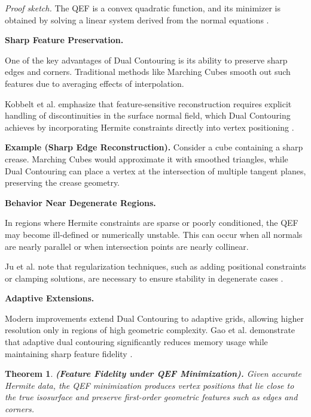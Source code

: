 \documentclass[12pt, a4paper, oneside]{book}
\theoremstyle{plain}
\newtheorem{theorem}{Theorem}[chapter]
\theoremstyle{definition}
\theoremstyle{remark}
\theoremstyle{definition}
\begin{document}
\textit{Proof sketch.} The QEF is a convex quadratic function, and its minimizer is obtained by solving a linear system derived from the normal equations \cite{schaefer2005qef}.

\vspace{0.5em}

\textbf{Sharp Feature Preservation.}

One of the key advantages of Dual Contouring is its ability to preserve sharp edges and corners. Traditional methods like Marching Cubes smooth out such features due to averaging effects of interpolation.

Kobbelt et al. emphasize that feature-sensitive reconstruction requires explicit handling of discontinuities in the surface normal field, which Dual Contouring achieves by incorporating Hermite constraints directly into vertex positioning \cite{kobbelt2001feature}.

\textbf{Example (Sharp Edge Reconstruction).}
Consider a cube containing a sharp crease. Marching Cubes would approximate it with smoothed triangles, while Dual Contouring can place a vertex at the intersection of multiple tangent planes, preserving the crease geometry.

\vspace{0.5em}

\textbf{Behavior Near Degenerate Regions.}

In regions where Hermite constraints are sparse or poorly conditioned, the QEF may become ill-defined or numerically unstable. This can occur when all normals are nearly parallel or when intersection points are nearly collinear.

Ju et al. note that regularization techniques, such as adding positional constraints or clamping solutions, are necessary to ensure stability in degenerate cases \cite{ju2002dual}.

\vspace{0.5em}

\textbf{Adaptive Extensions.}

Modern improvements extend Dual Contouring to adaptive grids, allowing higher resolution only in regions of high geometric complexity. Gao et al. demonstrate that adaptive dual contouring significantly reduces memory usage while maintaining sharp feature fidelity \cite{gao2010adaptive}.

\vspace{0.5em}
\begin{theorem}
    \textbf{ (Feature Fidelity under QEF Minimization).}
Given accurate Hermite data, the QEF minimization produces vertex positions that lie close to the true isosurface and preserve first-order geometric features such as edges and corners.

\end{theorem}
\end{document}
